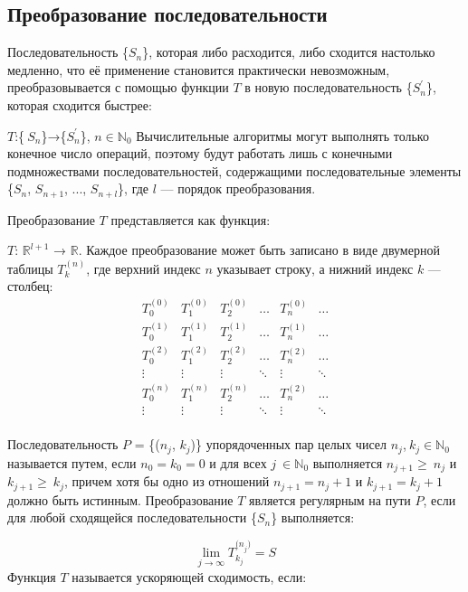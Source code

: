 \documentclass[14pt, a4paper]{extarticle}
\theoremstyle{definition}
\theoremstyle{remark}
\begin{document}
\subsection*{Преобразование последовательности}

Последовательность \{\(S_{n}\)\}, которая либо расходится, либо сходится
настолько медленно, что её применение становится практически
невозможным, преобразовывается с помощью функции \(T\) в новую
последовательность \{\(S_{n}^{'}\)\}, которая сходится быстрее:

\(T\):\{\(\ S_{n}\)\}→\{\(S_{n}^{'}\)\}, \(n \in \mathbb{N}_{0}\)
Вычислительные алгоритмы могут выполнять только конечное число операций,
поэтому будут работать лишь с конечными подмножествами
последовательностей, содержащими последовательные элементы \{\(S_{n}\),
\(S_{n + 1}\), ..., \(S_{n + l}\)\}, где \(l\) --- порядок
преобразования.

Преобразование \(T\) представляется как функция:

\(T\): \(\mathbb{R}^{l + 1}\) → \(\mathbb{R}\).
Каждое преобразование может быть записано в виде двумерной таблицы
\(T_{k}^{(n)}\), где верхний индекс \(n\) указывает строку, а нижний
индекс \(k\) --- столбец:
\[\begin{matrix}
T_{0}^{(0)} & T_{1}^{(0)} & T_{2}^{(0)} & \ldots & T_{n}^{(0)} & \ldots \\
T_{0}^{(1)} & T_{1}^{(1)} & T_{2}^{(1)} & \ldots & T_{n}^{(1)} & \ldots \\
T_{0}^{(2)} & T_{1}^{(2)} & T_{2}^{(2)} & \ldots & T_{n}^{(2)} & \ldots \\
 \vdots & \vdots & \vdots & \ddots & \vdots & \ddots \\
T_{0}^{(n)} & T_{1}^{(n)} & T_{2}^{(n)} & \ldots & T_{n}^{(2)} & \ldots \\
 \vdots & \vdots & \vdots & \ddots & \vdots & \ddots \\
\end{matrix}\]

Последовательность \(P\) = \{(\(n_{j}\), \(k_{j}\))\} упорядоченных пар
целых чисел \(n_{j}\),\(\ k_{j} \in \mathbb{N}_{0}\) называется путем, если \(n_{0} = k_{0} = 0\) и для всех
\(j\  \in \mathbb{N}_{0}\) выполняется \(n_{j + 1} \geq \ n_{j}\) и
\(k_{j + 1} \geq \ k_{j}\), причем хотя бы одно из отношений
\(n_{j + 1} = n_{j} + 1\) и \(k_{j + 1} = k_{j} + 1\) должно быть
истинным.
Преобразование \(T\) является регулярным на пути \(P\), если для любой
сходящейся последовательности \{\(S_{n}\)\} выполняется:

\[\lim_{j \rightarrow \infty}T_{k_{j}}^{{(n}_{j})} = S\]
Функция \(T\) называется ускоряющей сходимость, если:
\end{document}
